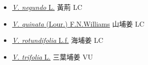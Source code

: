 \begin{itemize}
  \begin{itemize}
        \item[] \href{http://www.theplantlist.org/tpl1.1/search?q=Vitex+negundo}{\textit{V. negundo} L.}   黃荊   LC
        \item[] \href{http://www.theplantlist.org/tpl1.1/search?q=Vitex+quinata}{\textit{V. quinata} (Lour.) F.N.Williams}   山埔姜   LC
        \item[] \href{http://www.theplantlist.org/tpl1.1/search?q=Vitex+rotundifolia}{\textit{V. rotundifolia} L.f.}   海埔姜   LC
        \item[] \href{http://www.theplantlist.org/tpl1.1/search?q=Vitex+trifolia}{\textit{V. trifolia} L.}   三葉埔姜   VU
  \end{itemize}
  \end{itemize}
